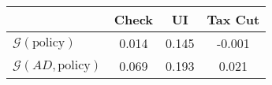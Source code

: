 \begin{tabular}{@{}lccc@{}} 
\toprule 
                          & Check      & UI    & Tax Cut    \\  \midrule 
$\mathcal{G}(\text{policy})$ & 0.014  & 0.145  & -0.001     \\ 
$\mathcal{G}(AD,\text{policy})$ & 0.069  & 0.193  & 0.021     \\ 
\end{tabular}  

